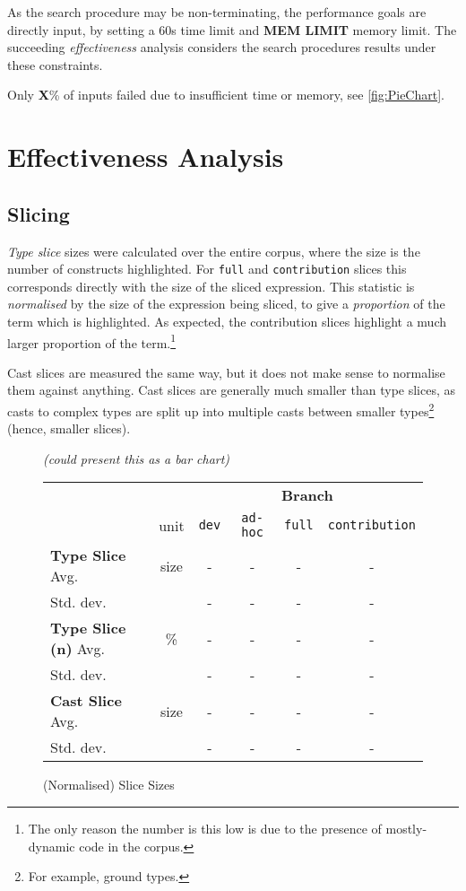 As the search procedure may be non-terminating, the performance goals are directly input, by setting a 60s time limit and \textbf{MEM LIMIT} memory limit. The succeeding \textit{effectiveness} analysis considers the search procedures results under these constraints.

Only \textbf{X}\% of inputs failed due to insufficient time or memory, see \cref{fig:PieChart}.

\section{Effectiveness Analysis}\label{sec:EffectivenessAnalysis}


\subsection{Slicing}
\textit{Type slice} sizes were calculated over the entire corpus, where the size is the number of constructs highlighted. For \texttt{full} and \texttt{contribution} slices this corresponds directly with the size of the sliced expression. This statistic is \textit{normalised} by the size of the expression being sliced, to give a \textit{proportion} of the term which is highlighted. As expected, the contribution slices highlight a much larger proportion of the term.\footnote{The only reason the number is this low is due to the presence of mostly-dynamic code in the corpus.}

Cast slices are measured the same way, but it does not make sense to normalise them against anything. Cast slices are generally much smaller than type slices, as casts to complex types are split up into multiple casts between smaller types\footnote{For example, ground types.} (hence, smaller slices).


\begin{figure}
  \centering
  \textit{(could present this as a bar chart)}
  \begin{tabular}{lc|cccc}
  & & \multicolumn{4}{c}{\textbf{Branch}}\\
   & unit & \texttt{dev} & \texttt{ad-hoc} & \texttt{full} & \texttt{contribution}\\
   \hline
   \textbf{Type Slice} Avg. & size &  - & - & - & -\\
   Std. dev. &  &  - & - & - & -\\
   \textbf{Type Slice (n)} Avg.& \% & - & - & - & -\\
   Std. dev. &  &  - & - & - & -\\
   \textbf{Cast Slice} Avg. & size & - & - & - & -\\
   Std. dev. &  &  - & - & - & -
  \end{tabular}
  
\caption{(Normalised) Slice Sizes}
\label{fig:SlicingEffectiveness}
\end{figure}


